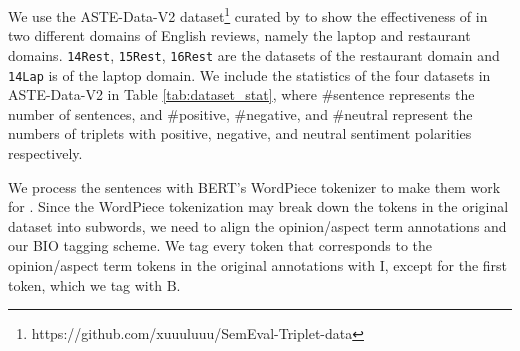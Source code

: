 \documentclass[sigconf]{acmart}
\begin{document}
\begin{table}[ht]
\caption{ASTE-Data-V2 Dataset Statistics}
\label{tab:dataset_stat}
\centering
{}
\vspace{-1em}
\end{table}

We use the ASTE-Data-V2 dataset\footnote{https://github.com/xuuuluuu/SemEval-Triplet-data} curated by \citet{xu2020position} to show the effectiveness of \mymodel{} in two different domains of English reviews, namely the laptop and restaurant domains. \texttt{14Rest}, \texttt{15Rest}, \texttt{16Rest} are the datasets of the restaurant domain and \texttt{14Lap} is of the laptop domain. We include the statistics of the four datasets in ASTE-Data-V2 in Table \ref{tab:dataset_stat}, where \#sentence represents the number of sentences, and \#positive, \#negative, and \#neutral represent the numbers of triplets with positive, negative, and neutral sentiment polarities respectively.

We process the sentences with BERT's WordPiece tokenizer \cite{wu2016google} to make them work for \mymodel{}. Since the WordPiece tokenization may break down the tokens in the original dataset into subwords, we need to align the opinion/aspect term annotations and our BIO tagging scheme. We tag every token that corresponds to the opinion/aspect term tokens in the original annotations with $\mathrm{I}$, except for the first token, which we tag with $\mathrm{B}$. 
\end{document}
